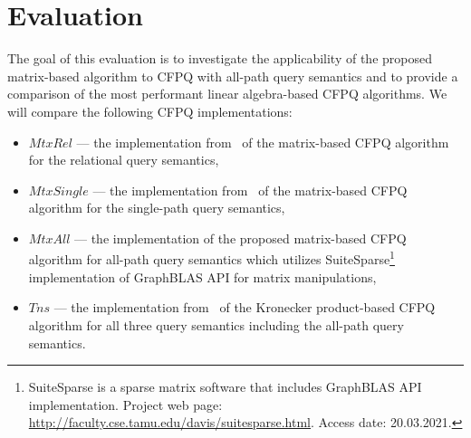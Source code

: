 \section{Evaluation}
The goal of this evaluation is to investigate the applicability of the proposed matrix-based algorithm to CFPQ with all-path query semantics and to provide a comparison of the most performant linear algebra-based CFPQ algorithms. We will compare the following CFPQ implementations:
\begin{itemize}
	\item $MtxRel$ --- the implementation from~\cite{Azimov:2018:CPQ:3210259.3210264} of the matrix-based CFPQ algorithm for the relational query semantics,
	\item $MtxSingle$ --- the implementation from~\cite{10.1145/3398682.3399163} of the matrix-based CFPQ algorithm for the single-path query semantics,
	\item $MtxAll$ --- the implementation of the proposed matrix-based CFPQ algorithm for all-path query semantics which utilizes SuiteSparse\footnote{SuiteSparse is a sparse matrix software that includes GraphBLAS API implementation. Project web page: \url{http://faculty.cse.tamu.edu/davis/suitesparse.html}. Access date: 20.03.2021.}~\cite{Davis2018Algorithm9S} implementation of GraphBLAS API for matrix manipulations,
	\item $Tns$ --- the implementation from~\cite{kron} of the Kronecker product-based CFPQ algorithm for all three query semantics including the all-path query semantics.
	
\end{itemize}

	

